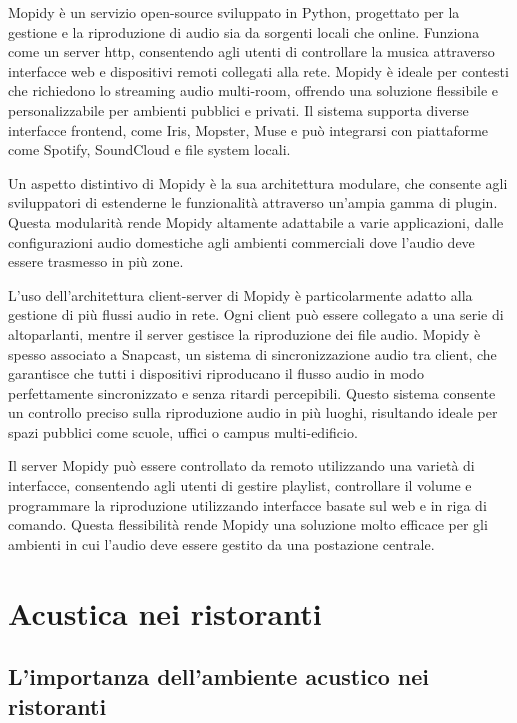 Mopidy è un servizio open-source sviluppato in Python, progettato per la gestione e la riproduzione di audio sia da sorgenti locali che online. Funziona come un server \gls{http}, consentendo agli utenti di controllare la musica attraverso interfacce web e dispositivi remoti collegati alla rete. Mopidy è ideale per contesti che richiedono lo streaming audio multi-room, offrendo una soluzione flessibile e personalizzabile per ambienti pubblici e privati. Il sistema supporta diverse interfacce frontend, come Iris, Mopster, Muse e può integrarsi con piattaforme come Spotify, SoundCloud e file system locali.

Un aspetto distintivo di Mopidy è la sua architettura modulare, che consente agli sviluppatori di estenderne le funzionalità attraverso un’ampia gamma di plugin. Questa modularità rende Mopidy altamente adattabile a varie applicazioni, dalle configurazioni audio domestiche agli ambienti commerciali dove l’audio deve essere trasmesso in più zone.

L’uso dell’architettura client-server di Mopidy è particolarmente adatto alla gestione di più flussi audio in rete. Ogni client può essere collegato a una serie di altoparlanti, mentre il server gestisce la riproduzione dei file audio. Mopidy è spesso associato a Snapcast, un sistema di sincronizzazione audio tra client, che garantisce che tutti i dispositivi riproducano il flusso audio in modo perfettamente sincronizzato e senza ritardi percepibili. Questo sistema consente un controllo preciso sulla riproduzione audio in più luoghi, risultando ideale per spazi pubblici come scuole, uffici o campus multi-edificio.

Il server Mopidy può essere controllato da remoto utilizzando una varietà di interfacce, consentendo agli utenti di gestire playlist, controllare il volume e programmare la riproduzione utilizzando interfacce basate sul web e in riga di comando. Questa flessibilità rende Mopidy una soluzione molto efficace per gli ambienti in cui l'audio deve essere gestito da una postazione centrale.

\section{Acustica nei ristoranti}

\subsection{L'importanza dell'ambiente acustico nei ristoranti}
\noindent

